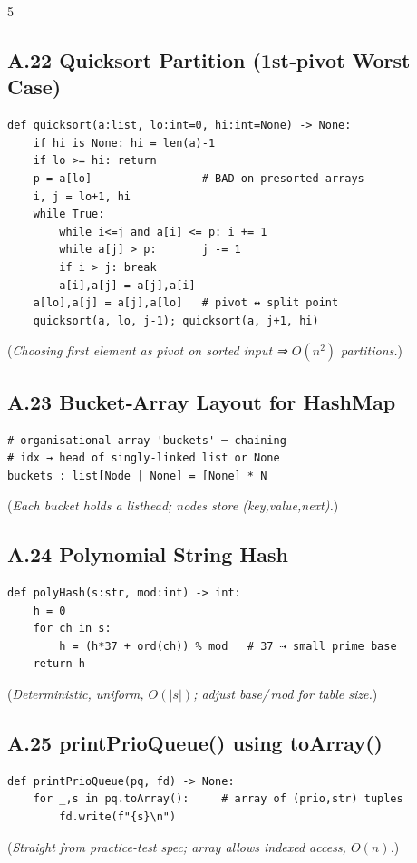 \documentclass[6pt,landscape]{article}
\begin{document}
\begin{multicols}{5}
\subsection{A.22 Quicksort Partition (1st‐pivot Worst Case)}\label{code:A22}
\begin{verbatim}
def quicksort(a:list, lo:int=0, hi:int=None) -> None:
    if hi is None: hi = len(a)-1
    if lo >= hi: return
    p = a[lo]                 # BAD on presorted arrays
    i, j = lo+1, hi
    while True:
        while i<=j and a[i] <= p: i += 1
        while a[j] > p:       j -= 1
        if i > j: break
        a[i],a[j] = a[j],a[i]
    a[lo],a[j] = a[j],a[lo]   # pivot ↔ split point
    quicksort(a, lo, j-1); quicksort(a, j+1, hi)
\end{verbatim}
(\textit{Choosing first element as pivot on sorted input ⇒ $O(n^{2})$ partitions.})

\subsection{A.23 Bucket‐Array Layout for HashMap}\label{code:A23}
\begin{verbatim}
# organisational array 'buckets' ─ chaining
# idx → head of singly-linked list or None
buckets : list[Node | None] = [None] * N
\end{verbatim}
(\textit{Each bucket holds a listhead; nodes store (key,value,next).})

\subsection{A.24 Polynomial String Hash}\label{code:A24}
\begin{verbatim}
def polyHash(s:str, mod:int) -> int:
    h = 0
    for ch in s:
        h = (h*37 + ord(ch)) % mod   # 37 ⇢ small prime base
    return h
\end{verbatim}
(\textit{Deterministic, uniform, $O(|s|)$; adjust base/\,mod for table size.})

\subsection{A.25 printPrioQueue() using toArray()}\label{code:A25}
\begin{verbatim}
def printPrioQueue(pq, fd) -> None:
    for _,s in pq.toArray():     # array of (prio,str) tuples
        fd.write(f"{s}\n")
\end{verbatim}
(\textit{Straight from practice-test spec; array allows indexed access, $O(n)$.})



\end{multicols}
\end{document}
